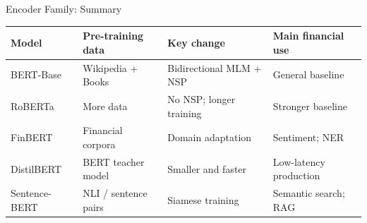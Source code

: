 \documentclass[11pt,aspectratio=169,professionalfonts]{beamer}
\begin{document}
\begin{frame}{Encoder Family: Summary}

  \begin{center}
  \scriptsize
  \renewcommand{\arraystretch}{1.3}
  \setlength{\tabcolsep}{3pt}

  \begin{tabular}{@{}llll@{}}
    \toprule
    \textbf{Model}
      & \textbf{Pre-training data}
      & \textbf{Key change}
      & \textbf{Main financial use} \\
    \midrule

    BERT-Base
      & Wikipedia + Books
      & Bidirectional MLM + NSP
      & General baseline \\

    RoBERTa
      & More data
      & No NSP; longer training
      & Stronger baseline \\

    FinBERT
      & Financial corpora
      & Domain adaptation
      & Sentiment; NER \\

    DistilBERT
      & BERT teacher model
      & Smaller and faster
      & Low-latency production \\

    Sentence-BERT
      & NLI / sentence pairs
      & Siamese training
      & Semantic search; RAG \\

    \bottomrule
  \end{tabular}

  \end{center}

\end{frame}%
%
\end{document}
